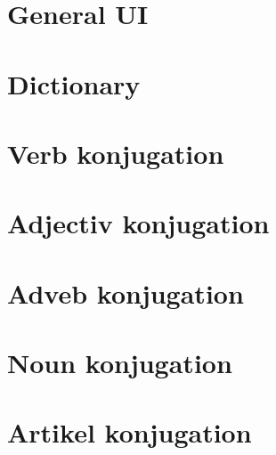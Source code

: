 \documentclass[a4paper]{article}
\title{}
\date{}
\author{Mohammad Rahmani}
\begin{document}
   \maketitle
   
   \section{General UI}
   \section{Dictionary}
   \section{Verb konjugation}
   \section{Adjectiv konjugation}
   \section{Adveb konjugation}
   \section{Noun konjugation}
   \section{Artikel konjugation}

   
   
\end{document}
